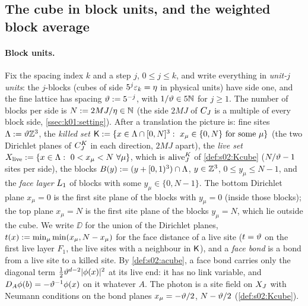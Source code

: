 \subsection{The cube in block units, and the weighted block average}\label{app:a01:weights}

\paragraph{Block units.} Fix the spacing index $k$ and a step $j$, $0\le j\le k$, and write everything in \emph{unit-$j$ units}: the $j$-blocks (cubes of side $5^{j}\varepsilon_k=\eta$ in physical units) have side one, and the fine lattice has spacing $\vartheta:=5^{-j}$, with $1/\vartheta\in5\mathbb N$ for $j\ge1$. The number of blocks per side is $N:=2MJ/\eta\in\mathbb N$ (the side $2MJ$ of $C_J$ is a multiple of every block side, \cref{ssec:k01:setting}). After a translation the picture is: fine sites $\Lambda:=\vartheta\mathbb Z^3$, the \emph{killed set} $\Kill\defeq\{x\in\Lambda\cap[0,N]^3:\ x_\mu\in\{0,N\}\text{ for some }\mu\}$ (the two Dirichlet planes of $C^{K}_{J}$ in each direction, $2MJ$ apart), the \emph{live set} $\Xl\defeq\{x\in\Lambda:\ 0<x_\mu<N\ \forall\mu\}$, which is $\operatorname{alive}^K_J$ of \cref{def:s02:Kcube} ($N/\vartheta-1$ sites per side), the blocks $B(y):=(y+[0,1)^3)\cap\Lambda$, $y\in\mathbb Z^3$, $0\le y_\mu\le N-1$, and the \emph{face layer} $L_{1}$ of blocks with some $y_\mu\in\{0,N-1\}$. The bottom Dirichlet plane $x_\mu=0$ is the first site plane of the blocks with $y_\mu=0$ (inside those blocks); the top plane $x_\mu=N$ is the first site plane of the blocks $y_\mu=N$, which lie outside the cube. We write $\DD$ for the union of the Dirichlet planes, $t(x):=\min_\mu\min(x_\mu,N-x_\mu)$ for the face distance of a live site ($t=\vartheta$ on the first live layer $F_1$, the live sites with a neighbour in $\mathsf K$), and a \emph{face bond} is a bond from a live site to a killed site. By \cref{def:s02:acube}, a face bond carries only the diagonal term $\frac12\vartheta^{d-2}|\phi(x)|^2$ at its live end: it has no link variable, and $D_A\phi(b)=-\vartheta^{-1}\phi(x)$ on it whatever $A$. The photon is a site field on $X_J$ with Neumann conditions on the bond planes $x_\mu=-\vartheta/2$, $N-\vartheta/2$ (\cref{def:s02:Kcube}).

